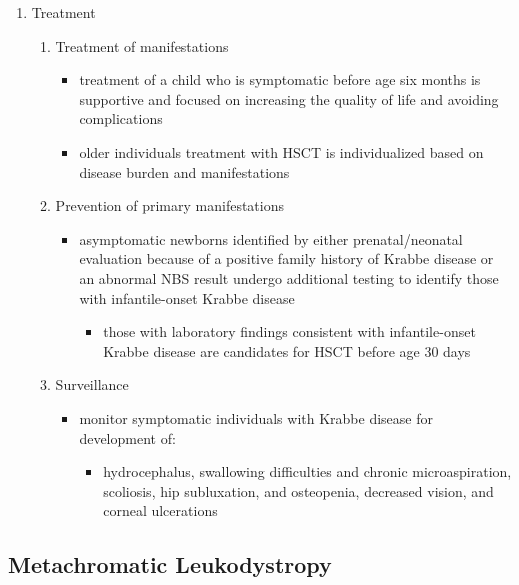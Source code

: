 \documentclass[12pt]{scrartcl}
\begin{document}
\begin{enumerate}
\item Treatment
\label{sec:orgbd3c201}
\begin{enumerate}
\item Treatment of manifestations
\label{sec:org9e2dfad}
\begin{itemize}
\item treatment of a child who is symptomatic before age six months is
supportive and focused on increasing the quality of life and
avoiding complications
\item older individuals treatment with HSCT is individualized based on
disease burden and manifestations
\end{itemize}

\item Prevention of primary manifestations
\label{sec:orgee8d6f2}
\begin{itemize}
\item asymptomatic newborns identified by either prenatal/neonatal
evaluation because of a positive family history of Krabbe disease
or an abnormal NBS result undergo additional testing to identify
those with infantile-onset Krabbe disease
\begin{itemize}
\item those with laboratory findings consistent with infantile-onset
Krabbe disease are candidates for HSCT before age 30 days
\end{itemize}
\end{itemize}

\item Surveillance
\label{sec:org3545880}
\begin{itemize}
\item monitor symptomatic individuals with Krabbe disease for
development of:
\begin{itemize}
\item hydrocephalus, swallowing difficulties and chronic
microaspiration, scoliosis, hip subluxation, and osteopenia,
decreased vision, and corneal ulcerations
\end{itemize}
\end{itemize}
\end{enumerate}
\end{enumerate}
\subsection{Metachromatic Leukodystropy}
\label{sec:org7199480}
\end{document}
